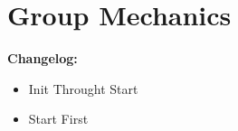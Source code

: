 \chapter{Group Mechanics}
\setcounter{section}{0}

\textbf{Changelog:}\\
\begin{itemize}
	\item {} Init Throught Start
	\item {} Start First
\end{itemize}

\pagebreak
